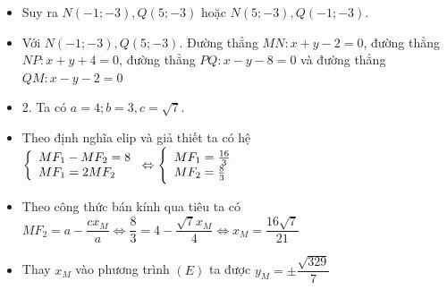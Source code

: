 \begin{itemize}[label=,leftmargin=*]
\item Suy ra $N(-1;-3), Q(5;-3)$ hoặc $N(5;-3),Q(-1;-3)$.
\item Với $N(-1;-3), Q(5;-3)$. Đường thẳng $MN: x+y-2=0$, đường thẳng $NP:x+y+4=0$, đường thẳng $PQ: x-y-8=0$ và đường thẳng $QM:x-y-2=0$
\item 2. Ta có $a=4;b=3,c=\sqrt{7}$.
\item Theo định nghĩa elip và giả thiết ta có hệ $\left\{\begin{array}{ll}MF_1-MF_2=8 \\ MF_1=2MF_2\end{array}\right.\Leftrightarrow \left\{\begin{array}{ll}MF_1=\frac{16}{3} \\ MF_2=\frac{8}{3}\end{array}\right.$
\item Theo công thức bán kính qua tiêu ta có $MF_2=a-\dfrac{cx_M}{a}\Leftrightarrow \dfrac{8}{3}=4-\dfrac{\sqrt{7}x_M}{4}\Leftrightarrow x_M=\dfrac{16\sqrt{7}}{21}$
\item Thay $x_M$ vào phương trình $(E)$ ta được $y_M=\pm \dfrac{\sqrt{329}}{7}$
\end{itemize}

